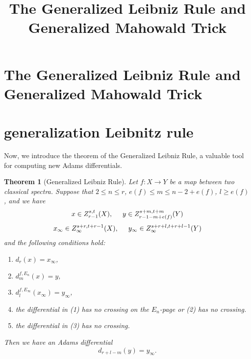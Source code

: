 \documentclass[12pt,a4paper]{article}
\title{The Generalized Leibniz Rule and Generalized Mahowald Trick}
\author{}
\newtheorem{theorem}[equation]{Theorem}
\begin{document}
\sffamily
\maketitle
\thispagestyle{empty}

\huge

\begin{sloppy}

\section{The Generalized Leibniz Rule and Generalized Mahowald Trick} \label{sec:rules}

\section{generalization Leibnitz rule}
Now, we introduce the theorem of the Generalized Leibniz Rule, a valuable tool for computing new Adams differentials.

\begin{theorem}[Generalized Leibniz Rule]\label{thm:e73f481e}
    Let $f: X\to Y$ be a map between two classical spectra.
    Suppose that $2\le n\le r$, $e(f)\le m\le n-2+e(f)$, $l\ge e(f)$, and we have
    $$x\in Z_{r-1}^{s,t}(X), \hspace{0.5cm} y\in Z_{r-1-m+e(f)}^{s+m,t+m}(Y)$$
    $$x_\infty\in Z_\infty^{s+r,t+r-1}(X), \hspace{0.5cm} y_\infty\in Z_\infty^{s+r+l,t+r+l-1}(Y)$$
    and the following conditions hold:
    \begin{enumerate}
        \item $d_{r}(x)=x_\infty$,
        \item $d_{m}^{f,E_n}(x)=y$,
        \item $d_{l}^{f,E_\infty}(x_\infty)=y_\infty$,
        \item the differential in (1) has no crossing on the $E_n$-page or (2) has no crossing.
        \item the differential in (3) has no crossing.%
    \end{enumerate}
    Then we have an Adams differential
    $$d_{r+l-m}(y)= y_\infty.$$
\end{theorem}


\end{sloppy}
\end{document}
